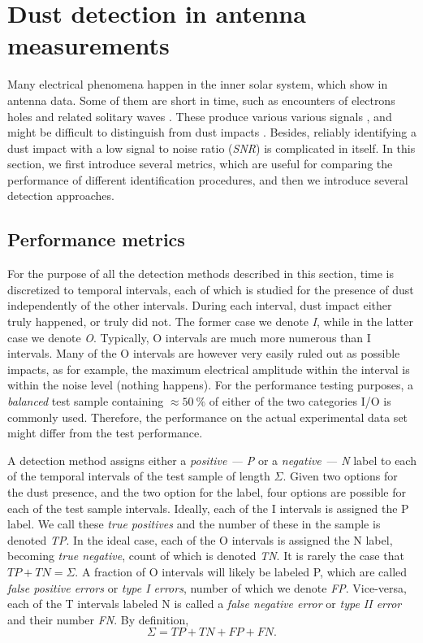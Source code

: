 \section{Dust detection in antenna measurements}

Many electrical phenomena happen in the inner solar system, which show in antenna data. Some of them are short in time, such as encounters of electrons holes and related solitary waves \citep{malaspina2013electrostatic,steinvall2019multispacecraft}. These produce various various signals \citep{pickett2004solitary}, and might be difficult to distinguish from dust impacts \citep{malaspina2016database,vaverka2018comparison}. Besides, reliably identifying a dust impact with a low signal to noise ratio (\textit{SNR}) is complicated in itself. In this section, we first introduce several metrics, which are useful for comparing the performance of different identification procedures, and then we introduce several detection approaches.

\subsection{Performance metrics}

For the purpose of all the detection methods described in this section, time is discretized to temporal intervals, each of which is studied for the presence of dust independently of the other intervals. During each interval, dust impact either truly happened, or truly did not. The former case we denote \textit{I}, while in the latter case we denote \textit{O}. Typically, O intervals are much more numerous than I intervals. Many of the O intervals are however very easily ruled out as possible impacts, as for example, the maximum electrical amplitude within the interval is within the noise level (nothing happens). For the performance testing purposes, a \textit{balanced} test sample containing $\approx \SI{50}{\%}$ of either of the two categories I/O is commonly used. Therefore, the performance on the actual experimental data set might differ from the test performance.

A detection method assigns either a \textit{positive --- P} or a \textit{negative --- N} label to each of the temporal intervals of the test sample of length $\Sigma$. Given two options for the dust presence, and the two option for the label, four options are possible for each of the test sample intervals. Ideally, each of the I intervals is assigned the P label. We call these \textit{true positives} and the number of these in the sample is denoted \textit{TP}. In the ideal case, each of the O intervals is assigned the N label, becoming \textit{true negative}, count of which is denoted \textit{TN}. It is rarely the case that $TP + TN = \Sigma$. A fraction of O intervals will likely be labeled P, which are called \textit{false positive errors} or \textit{type I errors}, number of which we denote \textit{FP}. Vice-versa, each of the T intervals labeled N is called a \textit{false negative error} or \textit{type II error} and their number \textit{FN}. By definition,
\begin{equation}
    \Sigma = TP + TN + FP + FN.
\end{equation}

